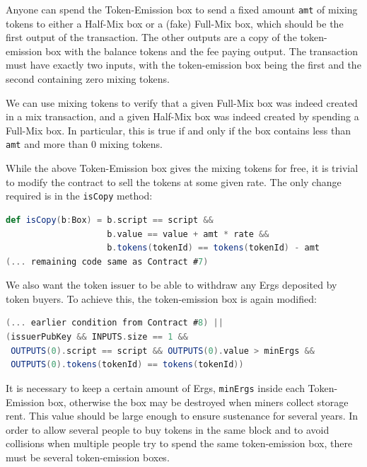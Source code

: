 \documentclass[runningheads]{llncs}
\begin{document}
Anyone can spend the Token-Emission box to send a fixed amount \texttt{amt} of mixing tokens to either a Half-Mix box or a (fake) Full-Mix box, which should be the first output of the transaction. The other outputs are a copy of the token-emission box with the balance tokens and the fee paying output. The transaction must have exactly two inputs, with the token-emission box being the first and the second containing zero mixing tokens. 

We can use mixing tokens to verify that a given Full-Mix box was indeed created in a mix transaction, and a given Half-Mix box was indeed created by spending a Full-Mix box. In particular, this is true if and only if the box contains less than \texttt{amt} and more than 0 mixing tokens.  

While the above Token-Emission box gives the mixing tokens for free, it is trivial to modify the contract to sell the tokens at some given rate. The only change required is in the \texttt{isCopy} method:

\begin{lstlisting}[language=Scala,caption={Token emission script with sell capability},label=tokenEmissionScriptWithSell]
def isCopy(b:Box) = b.script == script && 
                    b.value == value + amt * rate &&
                    b.tokens(tokenId) == tokens(tokenId) - amt
(... remaining code same as Contract #7)
\end{lstlisting}

We also want the token issuer to be able to withdraw any Ergs deposited by token buyers. To achieve this, the token-emission box is again modified:

\begin{lstlisting}[language=Scala,caption={Token emission script with withdraw capability},label=tokenEmissionScriptWithWithdraw]
(... earlier condition from Contract #8) || 
(issuerPubKey && INPUTS.size == 1 && 
 OUTPUTS(0).script == script && OUTPUTS(0).value > minErgs &&
 OUTPUTS(0).tokens(tokenId) == tokens(tokenId))
\end{lstlisting}

It is necessary to keep a certain amount of Ergs, \texttt{minErgs} inside each Token-Emission box, otherwise the box may be destroyed when miners collect storage rent. This value should be large enough to ensure sustenance for several years. 
In order to allow several people to buy tokens in the same block and to avoid collisions when multiple people try to spend the same token-emission box, there must be several token-emission boxes. 
\end{document}
